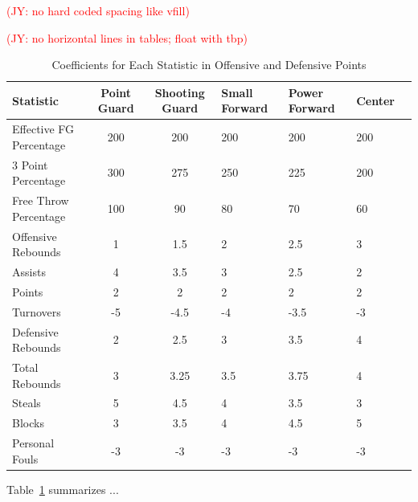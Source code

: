 \documentclass[12pt, titlepage]{article}
\newcommand{\jy}[1]{\textcolor{red}{(JY: #1)}}
\begin{document}
\jy{no hard coded spacing like vfill}

\jy{no horizontal lines in tables; float with tbp}

\begin{table}[tbp]
  \caption{Coefficients for Each Statistic in Offensive and Defensive Points}
  \label{tab:Coefficientstable}
\centering
\begin{tabular}[t]{lccllll}
  \toprule
  Statistic & Point Guard & Shooting Guard & Small Forward & Power Forward & Center\\
  \midrule
 Effective FG Percentage & 200 & 200 & 200 & 200 & 200\\
 \midrule
 3 Point Percentage & 300 & 275 & 250 & 225 & 200\\
 \midrule
 Free Throw Percentage & 100 & 90 & 80 & 70 & 60\\
 \midrule
 Offensive Rebounds & 1 & 1.5 & 2 & 2.5 & 3\\
 \midrule
 Assists & 4 & 3.5 & 3 & 2.5 & 2\\
 \midrule
 Points & 2 & 2 & 2 & 2 & 2\\
 \midrule
 Turnovers & -5 & -4.5 & -4 & -3.5 & -3\\
 \midrule
 Defensive Rebounds & 2 & 2.5 & 3 & 3.5 & 4\\
 \midrule
 Total Rebounds & 3 & 3.25 & 3.5 & 3.75 & 4\\
 \midrule
 Steals & 5 & 4.5 & 4 & 3.5 & 3\\
 \midrule
 Blocks & 3 & 3.5 & 4 & 4.5 & 5\\
 \midrule
 Personal Fouls & -3 & -3 & -3 & -3 & -3\\
  \bottomrule
\end{tabular}
\end{table}


Table~\ref{tab:Coefficientstable} summarizes ...
\end{document}

